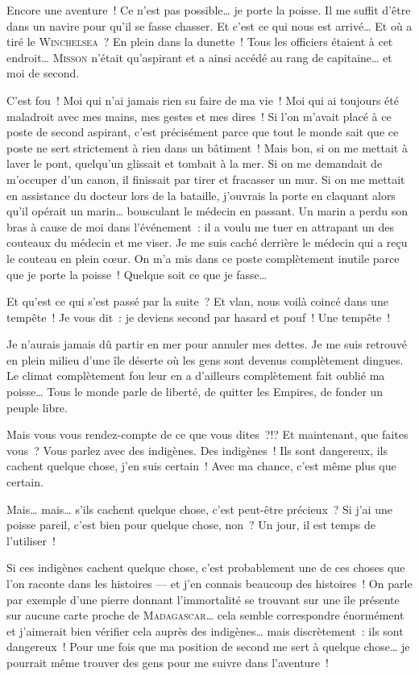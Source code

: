 {
	Encore une aventure~!
	Ce n’est pas possible… je porte la poisse.
	Il me suffit d’être dans un navire pour qu’il se fasse chasser.
	Et c’est ce qui nous est arrivé…
	Et où a tiré le \textsc{Winchelsea}~?  En plein dans la dunette~!
	Tous les officiers étaient à cet endroit…
	\textsc{Misson} n’était qu’aspirant et a ainsi accédé au rang de capitaine… et moi de second.

	C’est fou~!  Moi qui n’ai jamais rien su faire de ma vie~!
	Moi qui ai toujours été maladroit avec mes mains, mes gestes et mes dires~!
	Si l’on m’avait placé à ce poste de second aspirant, c’est précisément parce que tout le monde sait que ce poste ne sert strictement à rien dans un bâtiment~!
	Mais bon, si on me mettait à laver le pont, quelqu’un glissait et tombait à la mer.
	Si on me demandait de m’occuper d’un canon, il finissait par tirer et fracasser un mur.
	Si on me mettait en assistance du docteur lors de la bataille, j’ouvrais la porte en claquant alors qu’il opérait un marin… bousculant le médecin en passant.  Un marin a perdu son bras à cause de moi dans l’événement~:  il a voulu me tuer en attrapant un des couteaux du médecin et me viser.
	Je me suis caché derrière le médecin qui a reçu le couteau en plein cœur.
	On m’a mis dans ce poste complètement inutile parce que je porte la poisse~!
	Quelque soit ce que je fasse…

	Et qu’est ce qui s’est passé par la suite~?
	Et vlan, nous voilà coincé dans une tempête~!
	Je vous dit~:  je deviens second par hasard et pouf~!  Une tempête~!

	Je n’aurais jamais dû partir en mer pour annuler mes dettes.
	Je me suis retrouvé en plein milieu d’une île déserte où les gens sont devenus complètement dingues.
	Le climat complètement fou leur en a d’ailleurs complètement fait oublié ma poisse…
	Tous le monde parle de liberté, de quitter les Empires, de fonder un peuple libre.

	Mais vous vous rendez-compte de ce que vous dites~?!?
	Et maintenant, que faites vous~?  Vous parlez avec des indigènes.  Des indigènes~!
	Ils sont dangereux, ils cachent quelque chose, j’en suis certain~!  Avec ma chance, c’est même plus que certain.

	Mais… mais… s’ils cachent quelque chose, c’est peut-être précieux~?
	Si j’ai une poisse pareil, c’est bien pour quelque chose, non~?
	Un jour, il est temps de l’utiliser~!

	Si ces indigènes cachent quelque chose, c’est probablement une de ces choses que l’on raconte dans les histoires — et j’en connais beaucoup des histoires~!
	On parle par exemple d’une pierre donnant l’immortalité se trouvant sur une île présente sur aucune carte proche de \textsc{Madagascar}… cela semble correspondre énormément et j’aimerait bien vérifier cela auprès des indigènes… mais discrètement~:  ils sont dangereux~!
	Pour une fois que ma position de second me sert à quelque chose… je pourrait même trouver des gens pour me suivre dans l’aventure~!
}

